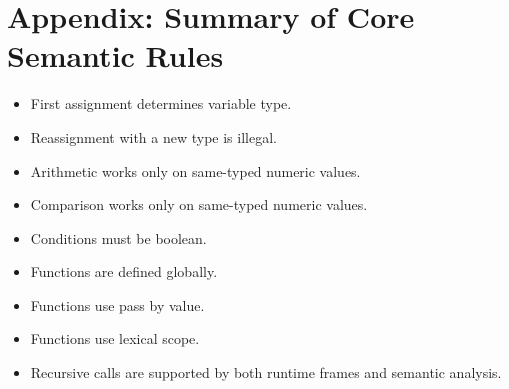 \documentclass[12pt,a4paper]{article}
\begin{document}
\section{Appendix: Summary of Core Semantic Rules}
\begin{itemize}[leftmargin=1.0cm]
    \item First assignment determines variable type.
    \item Reassignment with a new type is illegal.
    \item Arithmetic works only on same-typed numeric values.
    \item Comparison works only on same-typed numeric values.
    \item Conditions must be boolean.
    \item Functions are defined globally.
    \item Functions use pass by value.
    \item Functions use lexical scope.
    \item Recursive calls are supported by both runtime frames and semantic analysis.
\end{itemize}
\end{document}

